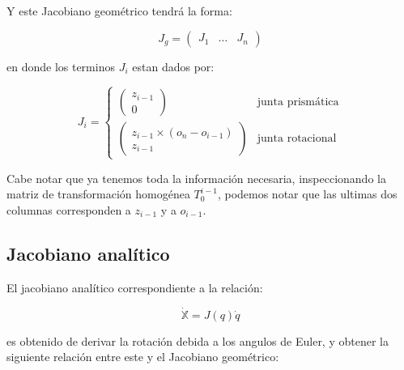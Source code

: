 \begin{multicols*}{3}
            Y este Jacobiano geométrico tendrá la forma:

            \begin{equation}
                J_g =
                \begin{pmatrix}
                    J_1 & \dots & J_n
                \end{pmatrix}
            \end{equation}

            en donde los terminos $J_i$ estan dados por:

            \begin{equation}
                J_i =
                \begin{cases}
                    \begin{pmatrix}
                        z_{i-1} \\
                        0
                    \end{pmatrix} & \text{junta prismática} \\
                    \begin{pmatrix}
                        z_{i-1} \times \left( o_n - o_{i-1} \right) \\
                        z_{i-1}
                    \end{pmatrix} & \text{junta rotacional}
                \end{cases}
            \end{equation}

            Cabe notar que ya tenemos toda la información necesaria, inspeccionando la matriz de transformación homogénea $T_0^{i-1}$, podemos notar que las ultimas dos columnas corresponden a $z_{i-1}$ y a $o_{i-1}$.


        \subsection{Jacobiano analítico}

            El jacobiano analítico correspondiente a la relación:

            \begin{equation}
                \dot{\mathbb{X}} = J(q) \dot{q}
            \end{equation}

            es obtenido de derivar la rotación debida a los angulos de Euler, y obtener la siguiente relación entre este y el Jacobiano geométrico:


\end{multicols*}
